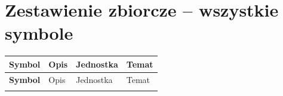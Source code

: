 \documentclass[12pt,a4paper]{article}
\begin{document}
\section{Zestawienie zbiorcze -- wszystkie symbole}

\begin{longtable}{>{\bfseries}p{2.0cm} p{7.0cm} p{3.2cm} p{2.5cm}}
\toprule
\rowcolor{headercolor}
\color{white}Symbol &
\color{white}Opis &
\color{white}Jednostka &
\color{white}Temat \\
\midrule
\endfirsthead
\toprule
\rowcolor{headercolor}
\color{white}Symbol &
\color{white}Opis &
\color{white}Jednostka &
\color{white}Temat \\
\midrule
\endhead
\bottomrule
\endfoot


\end{longtable}
\end{document}
